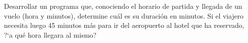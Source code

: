 Desarrollar un programa que, conociendo el horario de partida y llegada de un vuelo (hora y minutos), determine cuál es su duración en minutos. Si el viajero necesita luego 45 minutos más para ir del aeropuerto al hotel que ha reservado, ?`a qué hora llegara al mismo?